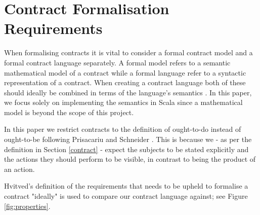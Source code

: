 \documentclass{ituthesis}
\begin{document}
\section{Contract Formalisation Requirements} \label{requirements}
When formalising contracts it is vital to consider a formal contract model and a formal contract language separately. A formal model refers to a semantic mathematical model of a contract while a formal language refer to a syntactic representation of a contract. When creating a contract language both of these should ideally be combined in terms of the language's semantics \cite{hvitved2011contract}. In this paper, we focus solely on implementing the semantics in Scala since a mathematical model is beyond the scope of this project.

In this paper we restrict contracts to the definition of ought-to-do instead of ought-to-be following Prisacariu and Schneider \cite{prisacariu2007formal}. This is because we - as per the definition in Section \ref{contract} - expect the subjects to be stated explicitly and the actions they should perform to be visible, in contrast to being the product of an action. 

Hvitved's definition of the requirements that needs to be upheld to formalise a contract "ideally" is used to compare our contract language against; see Figure \ref{fig:properties}.

\end{document}
